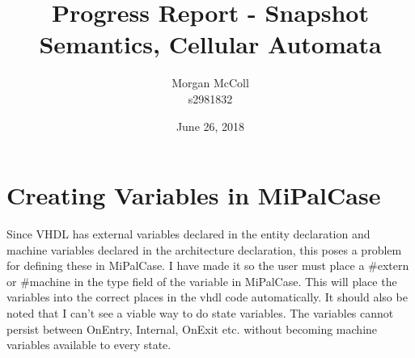 \documentclass{article}
\begin{document}
	\title{Progress Report - Snapshot Semantics, Cellular Automata}
	\author{Morgan McColl \\s2981832}
	\date{June 26, 2018}
	\maketitle
	\section{Creating Variables in MiPalCase}
		Since VHDL has external variables declared in the entity declaration and machine variables declared in the architecture declaration, this poses a problem for defining these in MiPalCase. I have made it so the user must place a \#extern or \#machine in the type field of the variable in MiPalCase. This will place the variables into the correct places in the vhdl code automatically. It should also be noted that I can't see a viable way to do state variables. The variables cannot persist between OnEntry, Internal, OnExit etc. without becoming machine variables available to every state.
\end{document}
